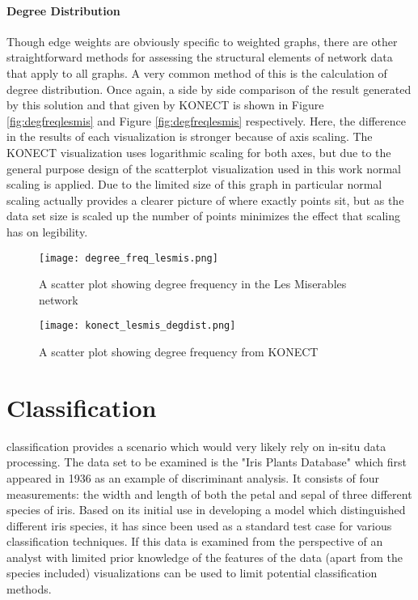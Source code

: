 \paragraph{Degree Distribution}
Though edge weights are obviously specific to weighted graphs, there are other straightforward methods for assessing the structural elements of network data that apply to all graphs. A very common method of this is the calculation of degree distribution. Once again, a side by side comparison of the result generated by this solution and that given by KONECT is shown in Figure \ref{fig:degfreqlesmis} and Figure \ref{fig:degfreqlesmis} respectively. Here, the difference in the results of each visualization is stronger because of axis scaling. The KONECT visualization uses logarithmic scaling for both axes, but due to the general purpose design of the scatterplot visualization used in this work normal scaling is applied. Due to the limited size of this graph in particular normal scaling actually provides a clearer picture of where exactly points sit, but as the data set size is scaled up the number of points minimizes the effect that scaling has on legibility. 

\begin{figure}
	\centering
	\begin{minipage}{0.45\textwidth}
		\centering
		\texttt{[image: degree\_freq\_lesmis.png]}
		\caption{A scatter plot showing degree frequency in the Les Miserables network}
		\label{fig:degfreqlesmis}
	\end{minipage}\hfill
	\begin{minipage}{0.45\textwidth}
		\centering
		\texttt{[image: konect\_lesmis\_degdist.png]}
		\caption{A scatter plot showing degree frequency from KONECT}
		\label{fig:degfreqkonect}
	\end{minipage}
\end{figure}

\section{Classification}
\label{sec:classification}
 classification provides a scenario which would very likely rely on in-situ data processing. The data set to be examined is the "Iris Plants Database" \cite{Fisher1936} which first appeared in 1936 as an example of discriminant analysis. It consists of four measurements: the width and length of both the petal and sepal of three different species of iris. Based on its initial use in developing a model which distinguished different iris species, it has since been used as a standard test case for various classification techniques. If this data is examined from the perspective of an analyst with limited prior knowledge of the features of the data (apart from the species included) visualizations can be used to limit potential classification methods. 

